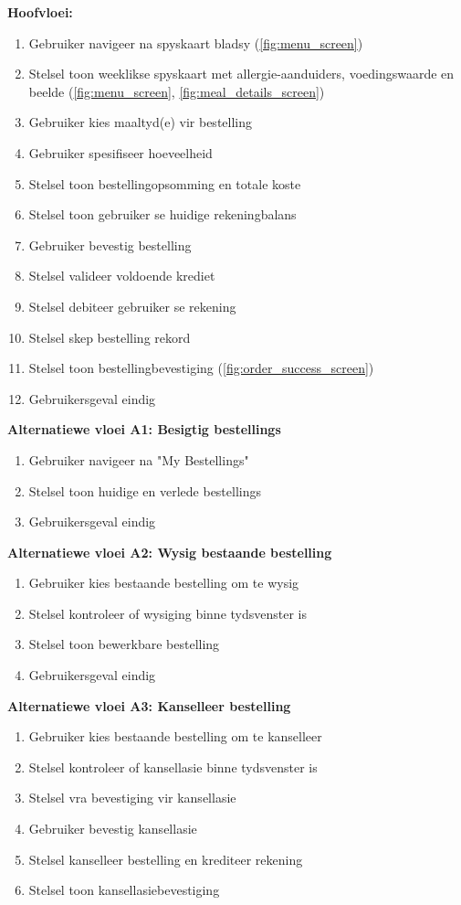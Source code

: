 \textbf{Hoofvloei:}
\begin{enumerate}
    \item Gebruiker navigeer na spyskaart bladsy (\autoref{fig:menu_screen})
    \item Stelsel toon weeklikse spyskaart met allergie-aanduiders, voedingswaarde en beelde (\autoref{fig:menu_screen}, \autoref{fig:meal_details_screen})
    \item Gebruiker kies maaltyd(e) vir bestelling
    \item Gebruiker spesifiseer hoeveelheid
    \item Stelsel toon bestellingopsomming en totale koste
    \item Stelsel toon gebruiker se huidige rekeningbalans
    \item Gebruiker bevestig bestelling
    \item Stelsel valideer voldoende krediet
    \item Stelsel debiteer gebruiker se rekening
    \item Stelsel skep bestelling rekord
    \item Stelsel toon bestellingbevestiging (\autoref{fig:order_success_screen})
    \item Gebruikersgeval eindig
\end{enumerate}

\textbf{Alternatiewe vloei A1: Besigtig bestellings}
\begin{enumerate}
    \item[1a.] Gebruiker navigeer na "My Bestellings"
    \item Stelsel toon huidige en verlede bestellings
    \item Gebruikersgeval eindig
\end{enumerate}

\textbf{Alternatiewe vloei A2: Wysig bestaande bestelling}
\begin{enumerate}
    \item[1b.] Gebruiker kies bestaande bestelling om te wysig
    \item Stelsel kontroleer of wysiging binne tydsvenster is
    \item Stelsel toon bewerkbare bestelling
    \item Gebruikersgeval eindig
\end{enumerate}

\textbf{Alternatiewe vloei A3: Kanselleer bestelling}
\begin{enumerate}
    \item[1c.] Gebruiker kies bestaande bestelling om te kanselleer
    \item Stelsel kontroleer of kansellasie binne tydsvenster is
    \item Stelsel vra bevestiging vir kansellasie
    \item Gebruiker bevestig kansellasie
    \item Stelsel kanselleer bestelling en krediteer rekening
    \item Stelsel toon kansellasiebevestiging
\end{enumerate}

